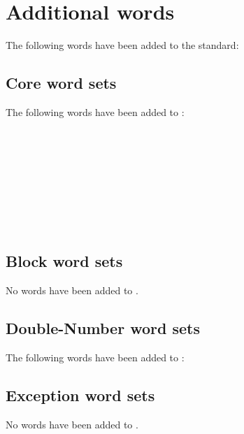 
\section{Additional words} %
\label{diff:new12}

The following words have been added to the standard:

\setcounter{subsection}{5}
\subsection{Core word sets}
The following words have been added to :

\begin{minipage}[t]{0.3\linewidth}
	 \\
	 \\
\end{minipage}
\hfill
\begin{minipage}[t]{0.3\linewidth}
	 \\
	 \\
\end{minipage}
\hfill
\begin{minipage}[t]{0.3\linewidth}
	 \\
	 \\
\end{minipage}


\subsection{Block word sets}
No words have been added to .

\subsection{Double-Number word sets}
The following words have been added to :


\subsection{Exception word sets}
No words have been added to .

